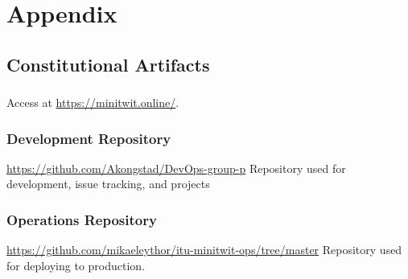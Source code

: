 \section{Appendix}
\label{app}

\subsection{Constitutional Artifacts}
\label{app:constArts}

\subsubsection{\mini}
\label{app:devRepo}
Access \mini at \href{https://minitwit.online/}{https://minitwit.online/}.

\subsubsection{Development Repository}
\label{app:devRepo}
\href{https://github.com/Akongstad/DevOps-group-p}{https://github.com/Akongstad/DevOps-group-p} Repository used for development, issue tracking, and projects

\subsubsection{Operations Repository}
\label{app:opsRepo}
\href{https://github.com/mikaeleythor/itu-minitwit-ops/tree/master}{https://github.com/mikaeleythor/itu-minitwit-ops/tree/master}
Repository used for deploying to production.

